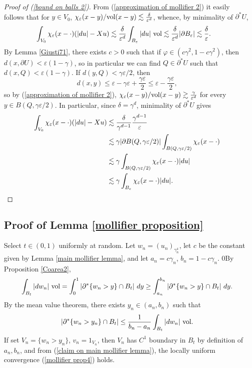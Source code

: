 \begin{proof}[Proof of (\ref{bound on balls 2})]
From (\ref{approximation of mollifier 2}) it easily follows that for $y \in V_0$, $\chi_\varepsilon(x - y)/\mathrm{vol}(x - y) \lesssim \frac{\delta}{\varepsilon^d}$,
whence, by minimality of $\partial^* U$,
\begin{align*}
\int_{V_0} \chi_\varepsilon(x - \cdot)(|du| - Xu) &\lesssim \frac{\delta}{\varepsilon^d} \int_{B_\varepsilon} |du| ~\mathrm{vol} \lesssim \frac{\delta}{\varepsilon^d} |\partial B_\varepsilon| \lesssim \frac{\delta}{\varepsilon}.
\end{align*}
By Lemma \ref{Giusti71}, there exists $c > 0$ such that if $\varphi \in (c\gamma^2, 1 - c\gamma^2)$, then $d(x, \partial U) < \varepsilon(1 - \gamma)$, so in particular we can find $Q \in \partial^* U$ such that $d(x, Q) < \varepsilon(1 - \gamma)$.
If $d(y, Q) < \gamma\varepsilon/2$, then
$$d(x, y) \leq \varepsilon - \gamma\varepsilon + \frac{\gamma\varepsilon}{2} \leq \varepsilon - \frac{\gamma\varepsilon}{2},$$
so by (\ref{approximation of mollifier 2}), $\chi_\varepsilon(x - y)/\mathrm{vol}(x - y) \gtrsim \frac{\gamma}{\varepsilon^d}$
for every $y \in B(Q, \gamma\varepsilon/2)$.
In particular, since $\delta = \gamma^d$, minimality of $\partial^* U$ gives
\begin{align*}
\int_{V_0} \chi_\varepsilon(x - \cdot)(|du| - Xu) &\lesssim \frac{\delta}{\gamma^{d - 1}} \frac{\gamma^{d - 1}}{\varepsilon}\\
&\lesssim \gamma |\partial B(Q, \gamma\varepsilon/2)| \int_{B(Q, \gamma\varepsilon/2)} \chi_\varepsilon(x - \cdot) \\
&\lesssim \gamma \int_{B(Q, \gamma\varepsilon/2)} \chi_\varepsilon(x - \cdot) |du|\\
&\lesssim \gamma \int_{B_\varepsilon} \chi_\varepsilon(x - \cdot) |du|. \qedhere
\end{align*}
\end{proof}


\subsection{Proof of Lemma \ref{mollifier proposition}}
Select $t \in (0, 1)$ uniformly at random.
Let $w_n = (u_n)_{\gamma_n^4}$, let $c$ be the constant given by Lemma \ref{main mollifier lemma}, and let $a_n = c\gamma_n$, $b_n = 1 - c\gamma_n$.
0By Proposition \ref{Coarea2},
$$\int_{B_t} |dw_n| ~\mathrm{vol} = \int_0^1 |\partial^* \{w_n > y\} \cap B_t| ~dy \geq \int_{a_n}^{b_n} |\partial^* \{w_n > y\} \cap B_t| ~dy.$$
By the mean value theorem, there exists $y_n \in (a_n, b_n)$ such that
\begin{equation}\label{MVT mollifier}
|\partial^* \{w_n > y_n\} \cap B_t| \leq \frac{1}{b_n - a_n} \int_{B_t} |dw_n| ~\mathrm{vol}.
\end{equation}
If set $V_n = \{w_n > y_n\}$, $v_n = 1_{V_n}$, then $V_n$ has $C^1$ boundary in $B_t$ by definition of $a_n, b_n$, and from (\ref{claim on main mollifier lemma}), the locally uniform convergence (\ref{mollifier prop4}) holds.

